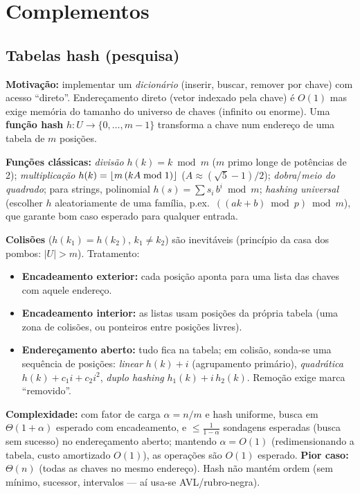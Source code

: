 \section{Complementos}

\subsection{Tabelas hash (pesquisa)}\label{sec:hash}
\begin{complemento}
\textbf{Motivação:} implementar um \emph{dicionário} (inserir, buscar, remover por chave) com acesso ``direto''. Endereçamento direto (vetor indexado pela chave) é $O(1)$ mas exige memória do tamanho do universo de chaves (infinito ou enorme). Uma \textbf{função hash} $h:U\to\{0,\dots,m-1\}$ transforma a chave num endereço de uma tabela de $m$ posições.

\textbf{Funções clássicas:} \emph{divisão} $h(k)=k\bmod m$ ($m$ primo longe de potências de 2); \emph{multiplicação} $h(k)=\lfloor m\,(kA\bmod1)\rfloor$ ($A\approx(\sqrt5-1)/2$); \emph{dobra}/\emph{meio do quadrado}; para strings, polinomial $h(s)=\sum s_i\,b^{i}\bmod m$; \emph{hashing universal} (escolher $h$ aleatoriamente de uma família, p.ex.\ $((ak+b)\bmod p)\bmod m$), que garante bom caso esperado para qualquer entrada.

\textbf{Colisões} ($h(k_1)=h(k_2)$, $k_1\ne k_2$) são inevitáveis (princípio da casa dos pombos: $|U|>m$). Tratamento:
\begin{itemize}
  \item \textbf{Encadeamento exterior:} cada posição aponta para uma lista das chaves com aquele endereço.
  \item \textbf{Encadeamento interior:} as listas usam posições da própria tabela (uma zona de colisões, ou ponteiros entre posições livres).
  \item \textbf{Endereçamento aberto:} tudo fica na tabela; em colisão, sonda-se uma sequência de posições: \emph{linear} $h(k)+i$ (agrupamento primário), \emph{quadrática} $h(k)+c_1i+c_2i^2$, \emph{duplo hashing} $h_1(k)+i\,h_2(k)$. Remoção exige marca ``removido''.
\end{itemize}
\textbf{Complexidade:} com fator de carga $\alpha=n/m$ e hash uniforme, busca em $\Theta(1+\alpha)$ esperado com encadeamento, e $\le\frac1{1-\alpha}$ sondagens esperadas (busca sem sucesso) no endereçamento aberto; mantendo $\alpha=O(1)$ (redimensionando a tabela, custo amortizado $O(1)$), as operações são $O(1)$ esperado. \textbf{Pior caso: $\Theta(n)$} (todas as chaves no mesmo endereço). Hash não mantém ordem (sem mínimo, sucessor, intervalos --- aí usa-se AVL/rubro-negra).
\end{complemento}
